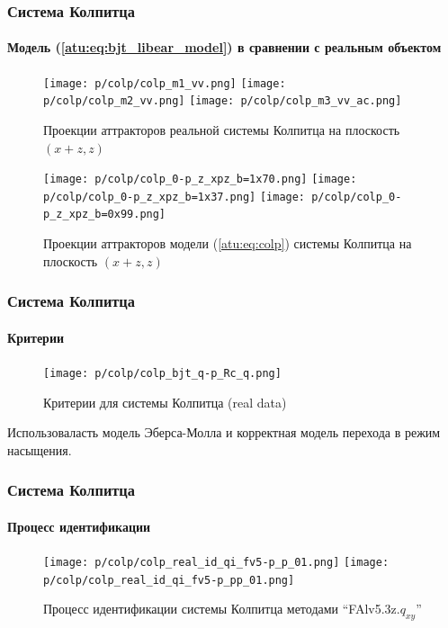 \documentclass[10pt,utf8]{beamer}
\begin{document}
\begin{frame}
  \frametitle{Система Колпитца}
  \framesubtitle{Модель (\ref{atu:eq:bjt_libear_model}) в сравнении с реальным объектом}

  \begin{figure}[htb!]
   \centerline{
     \texttt{[image: p/colp/colp\_m1\_vv.png]}
     \texttt{[image: p/colp/colp\_m2\_vv.png]}
     \texttt{[image: p/colp/colp\_m3\_vv\_ac.png]}
   }
    \caption{Проекции аттракторов реальной системы Колпитца на плоскость $(x+z,z)$}
    \label{atu:f:colp_real_xzz}
  \end{figure}

  \vspace{-4ex}

  \begin{figure}[htb!]
   \centerline{
     \texttt{[image: p/colp/colp\_0-p\_z\_xpz\_b=1x70.png]}
     \texttt{[image: p/colp/colp\_0-p\_z\_xpz\_b=1x37.png]}
     \texttt{[image: p/colp/colp\_0-p\_z\_xpz\_b=0x99.png]}
   }
    \caption{Проекции аттракторов модели (\ref{atu:eq:colp}) системы Колпитца на плоскость $(x+z,z)$}
    \label{atu:f:colp_model_xzz}
  \end{figure}

\end{frame}




\begin{frame}
  \frametitle{Система Колпитца}
  \framesubtitle{Критерии}

  \begin{figure}[htb!]
    \centerline{\texttt{[image: p/colp/colp\_bjt\_q-p\_Rc\_q.png]} }
    \caption{Критерии для системы Колпитца (real data)}
    \label{atu:f:colp_q}
  \end{figure}

  Использоваласть модель Эберса-Молла и корректная модель перехода в режим насыщения.

\end{frame}




\begin{frame}
  \frametitle{Система Колпитца}
  \framesubtitle{Процесс идентификации}


  \begin{figure}[ht!]
    \centerline{
      \texttt{[image: p/colp/colp\_real\_id\_qi\_fv5-p\_p\_01.png]}
      \texttt{[image: p/colp/colp\_real\_id\_qi\_fv5-p\_pp\_01.png]}
      \hfill
    }
    \caption{Процесс идентификации системы Колпитца методами ``FAlv5.3z.$q_{xy}$'' }
    \label{atu:f:colp_real_id0}
  \end{figure}

\end{frame}
\end{document}
